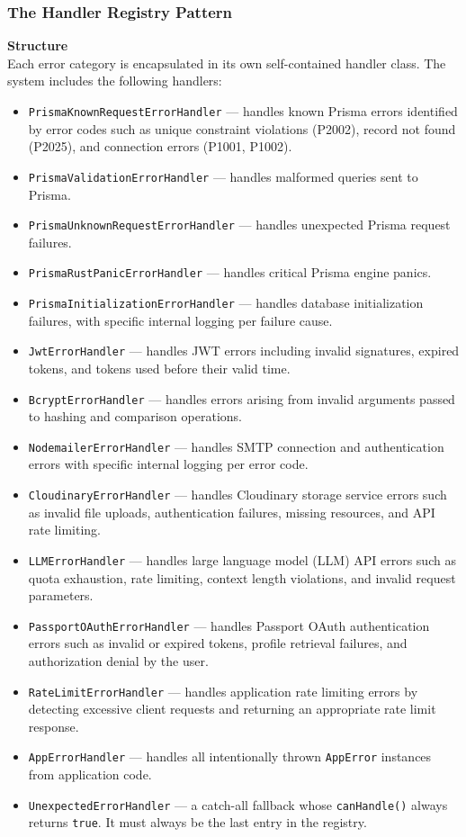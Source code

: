 \subsubsection{The Handler Registry Pattern}

\textbf{Structure}\\
Each error category is encapsulated in its own self-contained handler class. The system includes the following handlers:

\begin{itemize}
    \item \texttt{PrismaKnownRequestErrorHandler} — handles known Prisma errors identified by error codes such as unique constraint violations (P2002), record not found (P2025), and connection errors (P1001, 
    P1002).
    \item \texttt{PrismaValidationErrorHandler} — handles malformed queries sent to Prisma.
    \item \texttt{PrismaUnknownRequestErrorHandler} — handles unexpected Prisma request failures.
    \item \texttt{PrismaRustPanicErrorHandler} — handles critical Prisma engine panics.
    \item \texttt{PrismaInitializationErrorHandler} — handles database initialization failures, with specific internal logging per failure cause.
    \item \texttt{JwtErrorHandler} — handles JWT errors including invalid signatures, expired tokens, and tokens used before their valid time.
    \item \texttt{BcryptErrorHandler} — handles errors arising from invalid arguments passed to hashing and comparison operations.
    \item \texttt{NodemailerErrorHandler} — handles SMTP connection and authentication errors with specific internal logging per error code.
    \item \texttt{CloudinaryErrorHandler} — handles Cloudinary storage service errors such as invalid file uploads, authentication failures, missing resources, and API rate limiting.
    \item \texttt{LLMErrorHandler} — handles large language model (LLM) API errors such as quota exhaustion, rate limiting, context length violations, and invalid request parameters.
    \item \texttt{PassportOAuthErrorHandler} — handles Passport OAuth authentication errors such as invalid or expired tokens, profile retrieval failures, and authorization denial by the user.
    \item \texttt{RateLimitErrorHandler} — handles application rate limiting errors by detecting excessive client requests and returning an appropriate rate limit response.
    \item \texttt{AppErrorHandler} — handles all intentionally thrown \texttt{AppError} instances from application code.
    \item \texttt{UnexpectedErrorHandler} — a catch-all fallback whose \texttt{canHandle()} always returns \texttt{true}. It must always be the last entry in the registry.
  \end{itemize}

